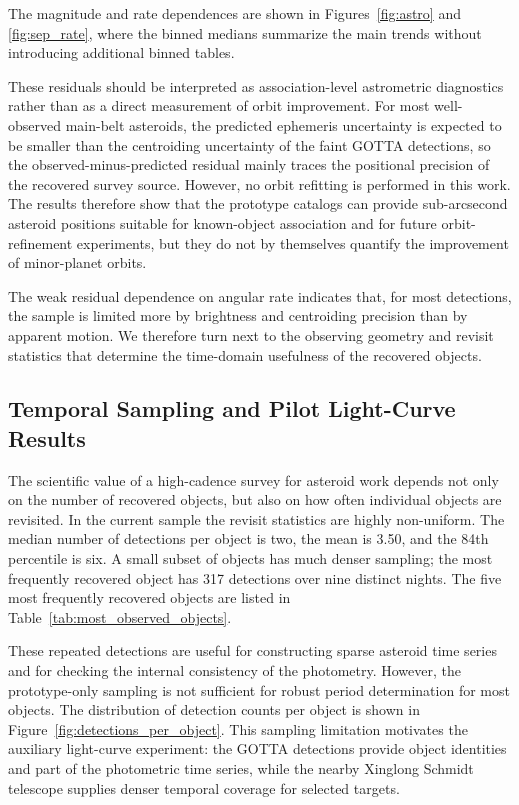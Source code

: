 \documentclass[referee]{raa}
\begin{document}
The magnitude and rate dependences are shown in Figures~\ref{fig:astro} and \ref{fig:sep_rate}, where the binned medians summarize the main trends without introducing additional binned tables.

These residuals should be interpreted as association-level astrometric diagnostics rather than as a direct measurement of orbit improvement. For most well-observed main-belt asteroids, the predicted ephemeris uncertainty is expected to be smaller than the centroiding uncertainty of the faint GOTTA detections, so the observed-minus-predicted residual mainly traces the positional precision of the recovered survey source. However, no orbit refitting is performed in this work. The results therefore show that the prototype catalogs can provide sub-arcsecond asteroid positions suitable for known-object association and for future orbit-refinement experiments, but they do not by themselves quantify the improvement of minor-planet orbits.

The weak residual dependence on angular rate indicates that, for most detections, the sample is limited more by brightness and centroiding precision than by apparent motion. We therefore turn next to the observing geometry and revisit statistics that determine the time-domain usefulness of the recovered objects.

\subsection{Temporal Sampling and Pilot Light-Curve Results}
\label{sec:temporal_sampling}
\label{sec:period_results}

The scientific value of a high-cadence survey for asteroid work depends not only on the number of recovered objects, but also on how often individual objects are revisited. In the current sample the revisit statistics are highly non-uniform. The median number of detections per object is two, the mean is 3.50, and the 84th percentile is six. A small subset of objects has much denser sampling; the most frequently recovered object has 317 detections over nine distinct nights. The five most frequently recovered objects are listed in Table~\ref{tab:most_observed_objects}.



These repeated detections are useful for constructing sparse asteroid time series and for checking the internal consistency of the photometry. However, the prototype-only sampling is not sufficient for robust period determination for most objects. The distribution of detection counts per object is shown in Figure~\ref{fig:detections_per_object}. This sampling limitation motivates the auxiliary light-curve experiment: the GOTTA detections provide object identities and part of the photometric time series, while the nearby Xinglong Schmidt telescope supplies denser temporal coverage for selected targets.
\end{document}
